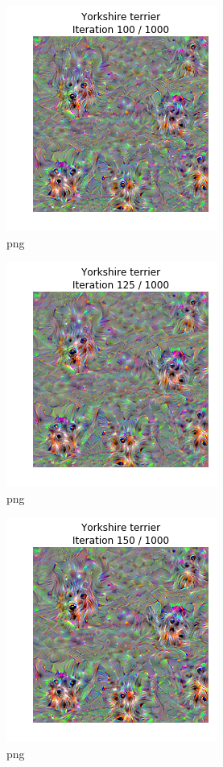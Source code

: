 \documentclass[]{book}
\theoremstyle{definition}
\theoremstyle{definition}
\theoremstyle{definition}
\theoremstyle{remark}
\begin{document}
\begin{figure}
\centering
\includegraphics{Network-Visualization-TensorFlow_files/Network-Visualization-TensorFlow_24_5.png}
\caption{png}
\end{figure}

\begin{figure}
\centering
\includegraphics{Network-Visualization-TensorFlow_files/Network-Visualization-TensorFlow_24_6.png}
\caption{png}
\end{figure}

\begin{figure}
\centering
\includegraphics{Network-Visualization-TensorFlow_files/Network-Visualization-TensorFlow_24_7.png}
\caption{png}
\end{figure}
\end{document}
